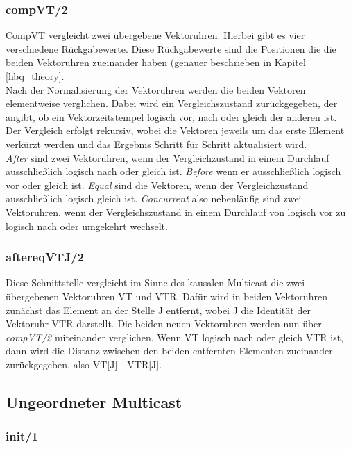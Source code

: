 \subsubsection{compVT/2}

CompVT vergleicht zwei übergebene Vektoruhren. Hierbei gibt es vier verschiedene Rückgabewerte. Diese Rückgabewerte sind die Positionen die die beiden Vektoruhren zueinander haben (genauer beschrieben in Kapitel \ref{hbq_theory}.\\
Nach der Normalisierung der Vektoruhren werden die beiden Vektoren elementweise verglichen. Dabei wird ein Vergleichszustand zurückgegeben, der angibt, ob ein Vektorzeitstempel logisch vor, nach oder gleich der anderen ist. Der Vergleich erfolgt rekursiv, wobei die Vektoren jeweils um das erste Element verkürzt werden und das Ergebnis Schritt für Schritt aktualisiert wird.\\
\textit{After} sind zwei Vektoruhren, wenn der Vergleichzustand in einem Durchlauf ausschließlich logisch nach oder gleich ist.
\textit{Before} wenn er ausschließlich logisch vor oder gleich ist.
\textit{Equal} sind die Vektoren, wenn der Vergleichzustand ausschließlich logisch gleich ist.
\textit{Concurrent} also nebenläufig sind zwei Vektoruhren, wenn der Vergleichszustand in einem Durchlauf von logisch vor zu logisch nach oder umgekehrt wechselt.

\subsubsection{aftereqVTJ/2}

Diese Schnittstelle vergleicht im Sinne des kausalen Multicast die zwei übergebenen Vektoruhren VT und VTR.
Dafür wird in beiden Vektoruhren zunächst das Element an der Stelle J entfernt, wobei J die Identität der Vektoruhr VTR darstellt.
Die beiden neuen Vektoruhren werden nun über \textit{compVT/2} miteinander verglichen. Wenn VT logisch nach oder gleich VTR ist, dann wird die Distanz zwischen den beiden entfernten Elementen zueinander zurückgegeben, also VT[J] - VTR[J].

\subsection{Ungeordneter Multicast}

\subsubsection{init/1}

